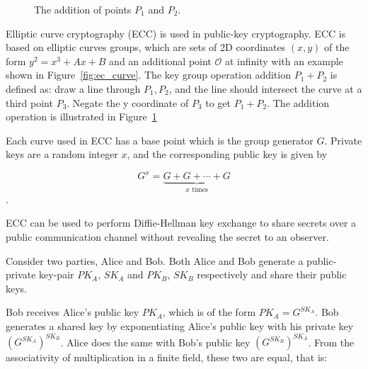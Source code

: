 \documentclass[final,dissertation.tex]{subfiles}
\begin{document}
\begin{figure}[!h]
\centering
{}
\caption{The addition of points $P_1$ and $P_2$.}
\label{fig:ec_addition}
\end{figure}

Elliptic curve cryptography (ECC) is used in public-key cryptography. ECC is based on elliptic curves groups, which are sets of 2D coordinates $(x, y)$ of the form $y^2 = x^3 + Ax + B$ and an additional point $\mathcal{O}$ at infinity with an example shown in Figure~\ref{fig:ec_curve}. The key group operation addition $P_1 + P_2$ is defined as: draw a line through $P_1, P_2$, and the line should intersect the curve at a third point $P_3$. Negate the y coordinate of $P_3$ to get $P_1 + P_2$. The addition operation is illustrated in Figure~\ref{fig:ec_addition}

Each curve used in ECC has a base point which is the group generator $G$. Private keys are a random integer $x$, and the corresponding public key is given by 

$$G^x = \underbrace{G + G + \cdots + G}_{x \text{ times}}$$.

ECC can be used to perform Diffie-Hellman key exchange to share secrets over a public communication channel without revealing the secret to an observer.

Consider two parties, Alice and Bob. Both Alice and Bob generate a public-private key-pair $PK_A$, $SK_A$ and $PK_B$, $SK_B$ respectively and share their public keys.

Bob receives Alice's public key $PK_A$, which is of the form $PK_A = G^{SK_A}$. Bob generates a shared key by exponentiating Alice's public key with his private key $(G^{SK_A})^{SK_B}$. Alice does the same with Bob's public key $(G^{SK_B})^{SK_A}$. From the associativity of multiplication in a finite field, these two are equal, that is:
\end{document}
